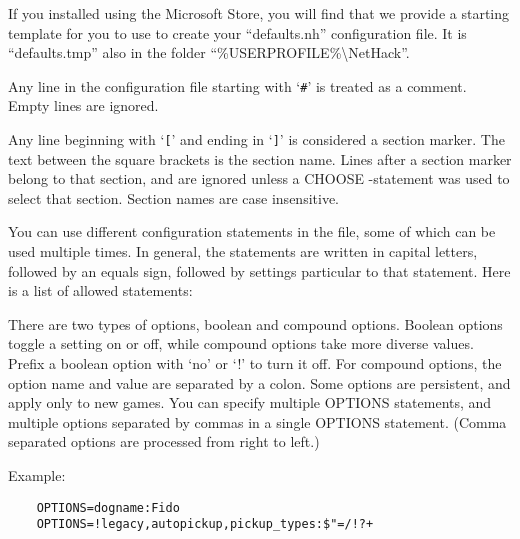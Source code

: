 If you installed using the Microsoft Store, you will find that we provide
a starting template for you to use to create your \mbox{``defaults.nh''}
configuration file.  It is \mbox{``defaults.tmp''} also in the folder
\mbox{{``\%USERPROFILE\%\textbackslash NetHack''}}.

Any line in the configuration file starting with `{\tt \#}' is treated as a comment.
Empty lines are ignored.

Any line beginning with `{\tt [}' and ending in `{\tt ]}' is considered a section
marker. The text between the square brackets is the section name.
Lines after a section marker belong to that section, and are
ignored unless a CHOOSE -statement was used to select that section.
Section names are case insensitive.

You can use different configuration statements in the file, some
of which can be used multiple times. In general, the statements are
written in capital letters, followed by an equals sign, followed by
settings particular to that statement. Here is a list of allowed statements:

\blist{}
\item[\bb{OPTIONS}]
There are two types of options, boolean and compound options.
Boolean options toggle a setting on or off, while compound options
take more diverse values.
Prefix a boolean option with `no' or `!' to turn it off.
For compound options, the option name and value are separated by a colon.
Some options are persistent, and apply only to new games.
You can specify multiple OPTIONS statements, and multiple options
separated by commas in a single OPTIONS statement.
(Comma separated options are processed from right to left.)

Example:
\begin{verbatim}
    OPTIONS=dogname:Fido
    OPTIONS=!legacy,autopickup,pickup_types:$"=/!?+
\end{verbatim}

